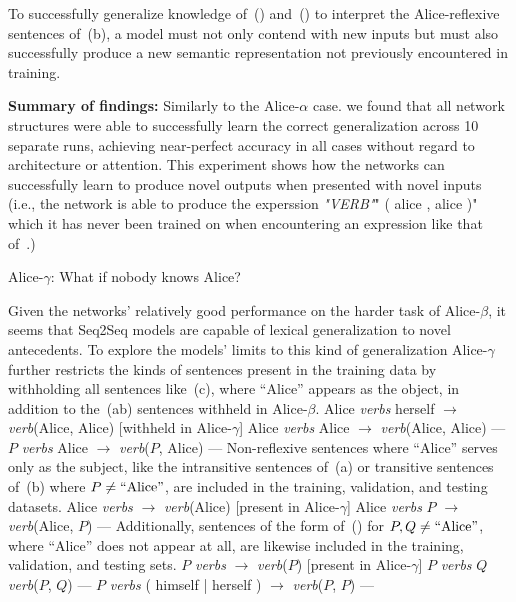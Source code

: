 To successfully generalize knowledge of~(\blastx) and~(\lastx) to interpret
the Alice-reflexive sentences of~(b), a model must
not only contend with new inputs but must also successfully produce a new 
semantic representation not previously encountered in training.

{\bf Summary of findings:} Similarly to the Alice-$\alpha$ case. we found that
all network structures were able to successfully learn the correct 
generalization across 10 separate runs, achieving near-perfect accuracy in all
cases without regard to architecture or attention. This experiment shows how
the networks can successfully learn to produce novel outputs when presented
with novel inputs (i.e., the network is able to produce the experssion
\ex
	{\it "VERB"}" ( alice , alice )"
\xe
which it has never been trained on when encountering an expression like that
of~.)



\ssec Alice-$\gamma$: What if nobody knows Alice?

Given the networks' relatively good performance on the harder task of 
Alice-$\beta$, it seems that Seq2Seq models are capable of lexical 
generalization to novel antecedents. To explore the models' limits to this
kind of generalization Alice-$\gamma$ further restricts the kinds of sentences
present in the training data by withholding all sentences like~(\nextx c), 
where ``Alice'' appears as the object, in addition to the~(\nextx ab) 
sentences withheld in Alice-$\beta$.
\pex
	\a Alice {\em verbs} herself $\to$ {\em verb}(Alice, Alice) \hfill [withheld in Alice-$\gamma$]
	\a Alice {\em verbs} Alice $\to$ {\em verb}(Alice, Alice) \hfill ---
	\a $P$ {\em verbs} Alice $\to$ {\em verb}($P$, Alice) \hfill ---
\xe
Non-reflexive sentences where ``Alice'' serves only as the subject, like the
intransitive sentences of~(\nextx a) or transitive sentences of~(\nextx b) 
where $P \not= \hbox{``Alice''}$, are included in the training, validation, and
testing datasets.
\pex
	\a Alice {\em verbs} $\to$ {\em verb}(Alice) \hfill [present in Alice-$\gamma$]
	\a Alice {\em verbs} $P$ $\to$ {\em verb}(Alice, $P$) \hfill ---
\xe
Additionally, sentences of the form of~(\nextx) for $P,Q \not= \hbox{``Alice''}$, where ``Alice'' does not appear at all, are likewise included in the
training, validation, and testing sets.
\pex
	\a $P$ {\em verbs} $\to$ {\em verb}($P$) \hfill [present in Alice-$\gamma$]
	\a $P$ {\em verbs} $Q$ {\em verb}($P$, $Q$) \hfill ---
	\a $P$ {\em verbs} ( himself | herself ) $\to$ {\em verb}($P$, $P$) \hfill ---
\xe

